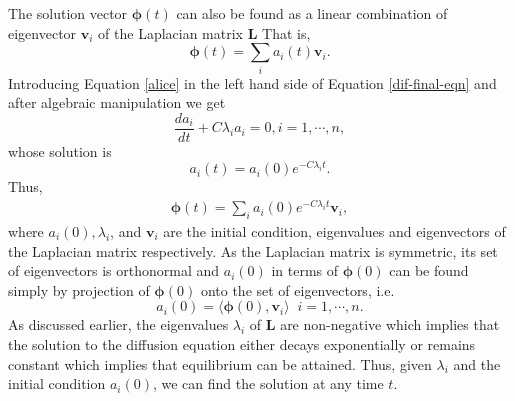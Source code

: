 \documentclass[10pt,a4paper]{article}
\begin{document}
The solution vector $\boldsymbol{\phi}(t)$ can also be found as a linear combination of eigenvector $\mathbf{v}_i$ of the Laplacian matrix $\mathbf{L}$ %
That is,
\begin{equation}\label{alice}
\boldsymbol{\phi}(t) = \sum_{i}a_{i}(t)\mathbf{v}_i.
\end{equation}
Introducing Equation \eqref{alice} in the left hand side of Equation \eqref{dif-final-eqn} and after algebraic manipulation we get
\begin{equation}
\frac{d a_i}{dt}+C\lambda_i a_i = 0, %
i=1,\cdots,n,
\end{equation}
whose solution is
\begin{equation}
a_i (t) = a_i (0)e^{-C\lambda_i t}.%
\end{equation}
Thus,
\begin{eqnarray*}
	\boldsymbol{\phi}(t) = \sum_i a_i(0) e^{-C\lambda_i t} \mathbf{v}_i,  %
\end{eqnarray*}
where $a_i(0), \lambda_i$, and $\mathbf{v}_i$ are the initial condition, eigenvalues and eigenvectors of the Laplacian matrix respectively. As the Laplacian matrix is symmetric, its set of eigenvectors is orthonormal and $a_i (0)$ in terms of $\boldsymbol{\phi}(0)$ can be found simply by projection of $\boldsymbol{\phi}(0)$ onto the set of eigenvectors, i.e.
\begin{equation}
a_i (0)= \langle \boldsymbol{\phi}(0),\mathbf{v}_i \rangle \;\;i=1,\cdots,n.
\end{equation}
As discussed earlier, the eigenvalues $\lambda_i$ of $\mathbf{L}$ are non-negative which implies that the solution to the diffusion equation either decays exponentially or remains constant which implies that equilibrium can be attained. Thus, given $\lambda_i$ and the initial condition $a_i(0)$, we can find the solution at any time $t$. 
\end{document}
